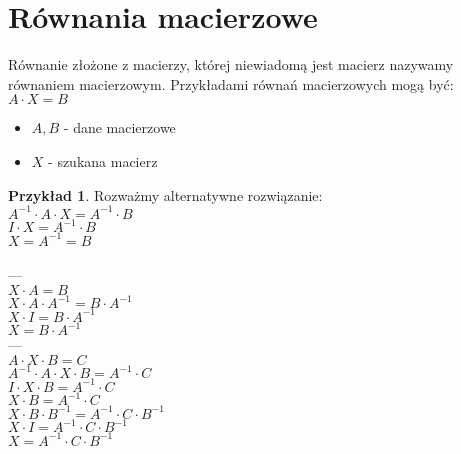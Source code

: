 \documentclass{article}
\theoremstyle{definition}
\theoremstyle{definition}
\theoremstyle{definition}
\newtheorem{pk}{Przykład}[subsection]
\theoremstyle{definition}
\begin{document}
\section{Równania macierzowe}
Równanie złożone z macierzy, której niewiadomą jest macierz nazywamy równaniem macierzowym.
Przykładami równań macierzowych mogą być:\\

$A\cdot X = B$
\begin{itemize}
    \item $A, B$ - dane macierzowe
    \item $X$ - szukana macierz
\end{itemize}

\begin{pk}
Rozważmy alternatywne rozwiązanie:\\
$A^{-1}\cdot A\cdot X = A^{-1}\cdot B$\\
$I\cdot X = A^{-1} \cdot B$\\
$X=A^{-1} = B$\\\\
---\\
$X\cdot A = B$\\
$X\cdot A\cdot A^{-1} = B\cdot A^{-1}$\\
$X\cdot I = B\cdot A^{-1}$\\
$X = B\cdot A^{-1}$\\
---\\
$A\cdot X\cdot B =C$\\
$A^{-1}\cdot A \cdot X \cdot B = A^{-1} \cdot C$\\
$I\cdot X \cdot B = A^{-1} \cdot C$\\
$X\cdot B = A^{-1} \cdot C$\\
$X\cdot B\cdot B^{-1} = A^{-1} \cdot C \cdot B^{-1}$\\
$X\cdot I=A^{-1}\cdot C\cdot B^{-1}$\\
$X=A^{-1} \cdot C \cdot B^{-1}$
\end{pk}
\end{document}
